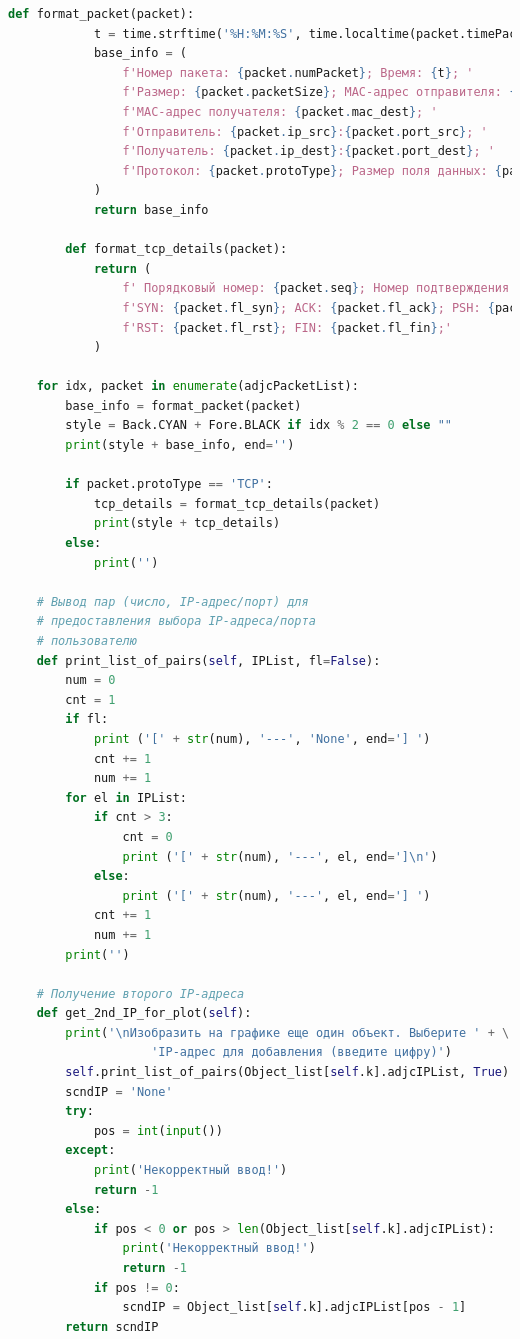 \documentclass[bachelor, och, coursework]{SCWorks}
\begin{document}
\begin{lstlisting}[language=Python]
        def format_packet(packet):
            t = time.strftime('%H:%M:%S', time.localtime(packet.timePacket))
            base_info = (
                f'Номер пакета: {packet.numPacket}; Время: {t}; '
                f'Размер: {packet.packetSize}; MAC-адрес отправителя: {packet.mac_src}; '
                f'MAC-адрес получателя: {packet.mac_dest}; '
                f'Отправитель: {packet.ip_src}:{packet.port_src}; '
                f'Получатель: {packet.ip_dest}:{packet.port_dest}; '
                f'Протокол: {packet.protoType}; Размер поля данных: {packet.len_data};'
            )
            return base_info

        def format_tcp_details(packet):
            return (
                f' Порядковый номер: {packet.seq}; Номер подтверждения: {packet.ack}; '
                f'SYN: {packet.fl_syn}; ACK: {packet.fl_ack}; PSH: {packet.fl_psh}; '
                f'RST: {packet.fl_rst}; FIN: {packet.fl_fin};'
            )

    for idx, packet in enumerate(adjcPacketList):
        base_info = format_packet(packet)
        style = Back.CYAN + Fore.BLACK if idx % 2 == 0 else ""
        print(style + base_info, end='')

        if packet.protoType == 'TCP':
            tcp_details = format_tcp_details(packet)
            print(style + tcp_details)
        else:
            print('')

    # Вывод пар (число, IP-адрес/порт) для
    # предоставления выбора IP-адреса/порта
    # пользователю
    def print_list_of_pairs(self, IPList, fl=False):
        num = 0
        cnt = 1
        if fl:
            print ('[' + str(num), '---', 'None', end='] ')
            cnt += 1
            num += 1
        for el in IPList:
            if cnt > 3:
                cnt = 0
                print ('[' + str(num), '---', el, end=']\n')
            else:
                print ('[' + str(num), '---', el, end='] ')
            cnt += 1
            num += 1
        print('')

    # Получение второго IP-адреса
    def get_2nd_IP_for_plot(self):
        print('\nИзобразить на графике еще один объект. Выберите ' + \
                    'IP-адрес для добавления (введите цифру)')
        self.print_list_of_pairs(Object_list[self.k].adjcIPList, True)
        scndIP = 'None'
        try:
            pos = int(input())
        except:
            print('Некорректный ввод!')
            return -1
        else:
            if pos < 0 or pos > len(Object_list[self.k].adjcIPList):
                print('Некорректный ввод!')
                return -1
            if pos != 0:
                scndIP = Object_list[self.k].adjcIPList[pos - 1]
        return scndIP


\end{lstlisting}
\end{document}
